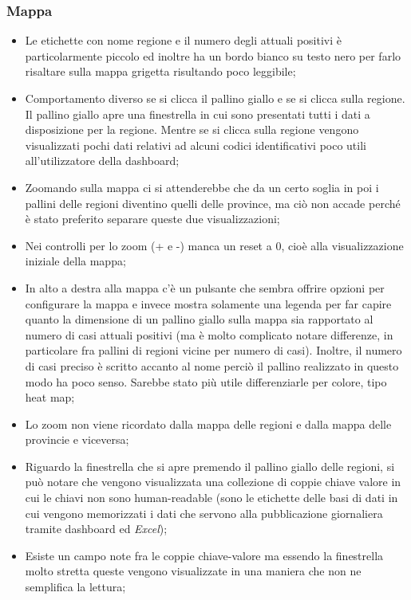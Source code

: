 \subsubsection{Mappa}
\begin{itemize}
    \item Le etichette con nome regione e il numero degli attuali positivi è particolarmente piccolo ed inoltre ha un bordo bianco su testo nero per farlo risaltare sulla mappa grigetta risultando poco leggibile;
    \item Comportamento diverso se si clicca il pallino giallo e se si clicca sulla regione. Il pallino giallo apre una finestrella in cui sono presentati tutti i dati a disposizione per la regione. Mentre se si clicca sulla regione vengono visualizzati pochi dati relativi ad alcuni codici identificativi poco utili all'utilizzatore della dashboard;
    \item Zoomando sulla mappa ci si attenderebbe che da un certo soglia in poi i pallini delle regioni diventino quelli delle province, ma ciò non accade perché è stato preferito separare queste due visualizzazioni;
    \item Nei controlli per lo zoom (+ e -) manca un reset a 0, cioè alla visualizzazione iniziale della mappa;
    \item In alto a destra alla mappa c'è un pulsante che sembra offrire opzioni per configurare la mappa e invece mostra solamente una legenda per far capire quanto la dimensione di un pallino giallo sulla mappa sia rapportato al numero di casi attuali positivi (ma è molto complicato notare differenze, in particolare fra pallini di regioni vicine per numero di casi). Inoltre, il numero di casi preciso è scritto accanto al nome perciò il pallino realizzato in questo modo ha poco senso. Sarebbe stato più utile differenziarle per colore, tipo heat map;
    \item Lo zoom non viene ricordato dalla mappa delle regioni e dalla mappa delle provincie e viceversa;
    \item Riguardo la finestrella che si apre premendo il pallino giallo delle regioni, si può notare che vengono visualizzata una collezione di coppie chiave valore in cui le chiavi non sono human-readable (sono le etichette delle basi di dati in cui vengono memorizzati i dati che servono alla pubblicazione giornaliera tramite dashboard ed \textit{Excel});
    \item Esiste un campo note fra le coppie chiave-valore ma essendo la finestrella molto stretta queste vengono visualizzate in una maniera che non ne semplifica la lettura;

\end{itemize}
